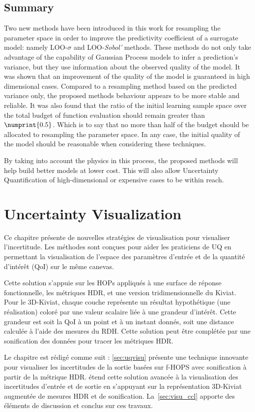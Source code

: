 \section{Summary}

Two new methods have been introduced in this work for resampling the parameter space in order to improve the predictivity coefficient of a surrogate model: namely LOO-$\sigma$ and LOO-\textit{Sobol'} methods. These methods do not only take advantage of the capability of Gaussian Process models to infer a prediction's variance, but they use information about the observed quality of the model. It was shown that an improvement of the quality of the model is guaranteed in high dimensional cases. Compared to a resampling method based on the predicted variance only, the proposed methods behaviour appears to be more stable and reliable. It was also found that the ratio of the initial learning sample space over the total budget of function evaluation should remain greater than $\numprint{0.5}$. Which is to say that no more than half of the budget should be allocated to resampling the parameter space. In any case, the initial quality of the model should be reasonable when considering these techniques.

By taking into account the physics in this process, the proposed methods will help build better models at lower cost. This will also allow Uncertainty Quantification of high-dimensional or expensive cases to be within reach.

\chapter{Uncertainty Visualization}\label{chap:visu}

\begin{chapquote}
Ce chapitre présente de nouvelles stratégies de visualisation pour visualiser l'incertitude. Les méthodes sont conçues pour aider les praticiens de UQ en permettant la visualisation de l'espace des paramètres d'entrée et de la quantité d'intérêt (QoI) sur le même canevas.

Cette solution s'appuie sur les HOPs appliqués à une surface de réponse fonctionnelle, les métriques HDR, et une version tridimensionnelle du Kiviat. Pour le 3D-Kiviat, chaque couche représente un résultat hypothétique (une réalisation) coloré par une valeur scalaire liée à une grandeur d'intérêt. Cette grandeur est soit la QoI à un point et à un instant donnés, soit une distance calculée à l'aide des mesures du RDH. Cette solution peut être complétée par une sonification des données pour tracer les métriques HDR.

Le chapitre est rédigé comme suit : \cref{sec:uqvisu} présente une technique innovante pour visualiser les incertitudes de la sortie basées sur f-HOPS avec sonification à partir de la métrique HDR.  étend cette solution avancée à la visualisation des incertitudes d'entrée et de sortie en s'appuyant sur la représentation 3D-Kiviat augmentée de mesures HDR et de sonification. La~\cref{sec:visu_ccl} apporte des éléments de discussion et conclus sur ces travaux.
\end{chapquote}

